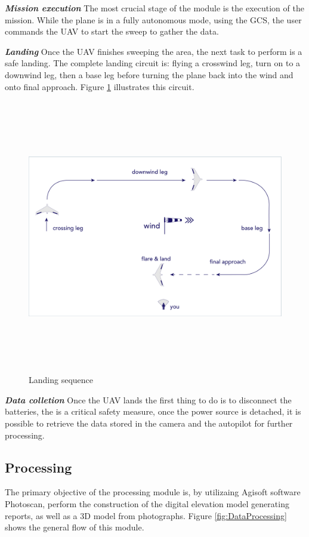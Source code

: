 \textit{\textbf{Mission execution}} \newline
The most crucial stage of the module is the execution of the mission. While the plane is in a fully autonomous mode, using the GCS, the user commands the UAV to start the sweep to gather the data.

\textit{\textbf{Landing}} \newline
Once the UAV finishes sweeping the area, the next task to perform is a safe landing. The complete landing circuit is: flying a crosswind leg, turn on to a downwind leg, then a base leg before turning the plane back into the wind and onto final approach. Figure \ref{fig:Landing} illustrates this circuit.
\begin{figure}[H]
\centering
\includegraphics[width=12cm,height=12cm,keepaspectratio]{imagenes/secuencia-aterrizaje-01.png}
\caption{Landing sequence}
\label{fig:Landing}
\end{figure}

\textit{\textbf{Data colletion}} \newline
Once the UAV lands the first thing to do is to disconnect the batteries, the is a critical safety measure, once the power source is detached, it is possible to retrieve the data stored in the camera and the autopilot for further processing. 

\subsection{Processing}
The primary objective of the processing module is, by utilizaing Agisoft software Photoscan, perform the construction of the digital elevation model generating reports, as well as a 3D model from photographs. Figure \ref{fig:DataProcessing} shows the general flow of this module.

